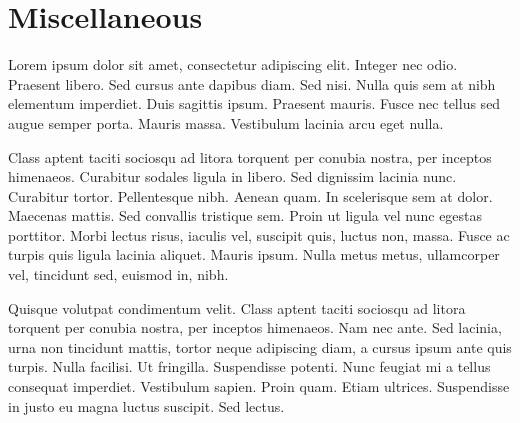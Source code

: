 \documentclass[12pt, final]{book}
\begin{document}
\chapter{Miscellaneous}\label{chapter3}
Lorem ipsum dolor sit amet, consectetur adipiscing elit. Integer nec odio. Praesent libero. Sed cursus ante dapibus diam. Sed nisi. Nulla quis sem at nibh elementum imperdiet. Duis sagittis ipsum. Praesent mauris. Fusce nec tellus sed augue semper porta. Mauris massa. Vestibulum lacinia arcu eget nulla. 

Class aptent taciti sociosqu ad litora torquent per conubia nostra, per inceptos himenaeos. Curabitur sodales ligula in libero. Sed dignissim lacinia nunc. Curabitur tortor. Pellentesque nibh. Aenean quam. In scelerisque sem at dolor. Maecenas mattis. Sed convallis tristique sem. Proin ut ligula vel nunc egestas porttitor. Morbi lectus risus, iaculis vel, suscipit quis, luctus non, massa. Fusce ac turpis quis ligula lacinia aliquet. Mauris ipsum. Nulla metus metus, ullamcorper vel, tincidunt sed, euismod in, nibh. 

Quisque volutpat condimentum velit. Class aptent taciti sociosqu ad litora torquent per conubia nostra, per inceptos himenaeos. Nam nec ante. Sed lacinia, urna non tincidunt mattis, tortor neque adipiscing diam, a cursus ipsum ante quis turpis. Nulla facilisi. Ut fringilla. Suspendisse potenti. Nunc feugiat mi a tellus consequat imperdiet. Vestibulum sapien. Proin quam. Etiam ultrices. Suspendisse in justo eu magna luctus suscipit. Sed lectus. 
\newpage

\newpage

\newpage

\newpage
%


\newpage

\end{document}
